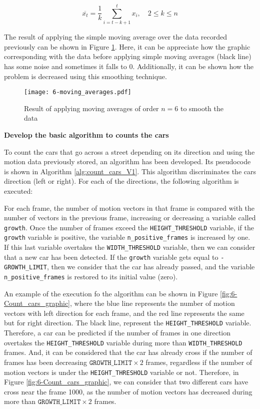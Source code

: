 \begin{equation} \label{eq:simple_moving_averages}
\overline { { x }_{ t } } =\frac { 1 }{ k } \sum _{ i=t-k+1 }^{ t }{ { x }_{ i } } ,\quad 2\le k\le n
\end{equation}

The result of applying the simple moving average over the data recorded previously can be shown in Figure \ref{fig:6-moving_averages}. Here, it can be appreciate how the graphic corresponding with the data before applying simple moving averages (black line) has some noise and sometimes it falls to 0. Additionally, it can be shown how the problem is decreased using this smoothing technique.

\begin{figure}[!h]
	\begin{center}
		\texttt{[image: 6-moving\_averages.pdf]}
		\caption{Result of applying moving averages of order $n = 6$ to smooth the data}
		\label{fig:6-moving_averages}
	\end{center}
\end{figure}


\textbf{Develop the basic algorithm to counts the cars}

To count the cars that go across a street depending on its direction and using the motion data previously stored, an algorithm has been developed. Its pseudocode is shown in Algorithm \ref{alg:count_cars_V1}. This algorithm discriminates the cars direction (left or right). For each of the directions, the following algorithm is executed: 

For each frame, the number of motion vectors in that frame is compared with the number of vectors in the previous frame, increasing or decreasing a variable called \texttt{growth}. Once the number of frames exceed the \texttt{HEIGHT\_THRESHOLD} variable, if the \texttt{growth} variable is positive, the variable \texttt{n\_positive\_frames} is increased by one. If this last variable overtakes the \texttt{WIDTH\_THRESHOLD} variable, then we can consider that a new car has been detected. If the \texttt{growth} variable gets equal to \texttt{-GROWTH\_LIMIT}, then we consider that the car has already passed, and the variable \texttt{n\_positive\_frames} is restored to its initial value (zero).

An example of the execution fo the algorithm can be shown in Figure \ref{fig:6-Count_cars_graphic}, where the blue line represents the number of motion vectors with left direction for each frame, and the red line represents the same but for right direction. The black line, represent the \texttt{HEIGHT\_THRESHOLD} variable. Therefore, a car can be predicted if the number of frames in one direction overtakes the \texttt{HEIGHT\_THRESHOLD} variable during more than \texttt{WIDTH\_THRESHOLD} frames. And, it can be considered that the car has already cross if the number of frames has been decreasing $\texttt{GROWTH\_LIMIT} \times 2 $ frames, regardless if the number of motion vectors is under the \texttt{HEIGHT\_THRESHOLD} variable or not. Therefore, in Figure \ref{fig:6-Count_cars_graphic}, we can consider that two different cars have cross near the frame 1000, as the number of motion vectors has decreased during more than $\texttt{GROWTH\_LIMIT} \times 2 $ frames.

